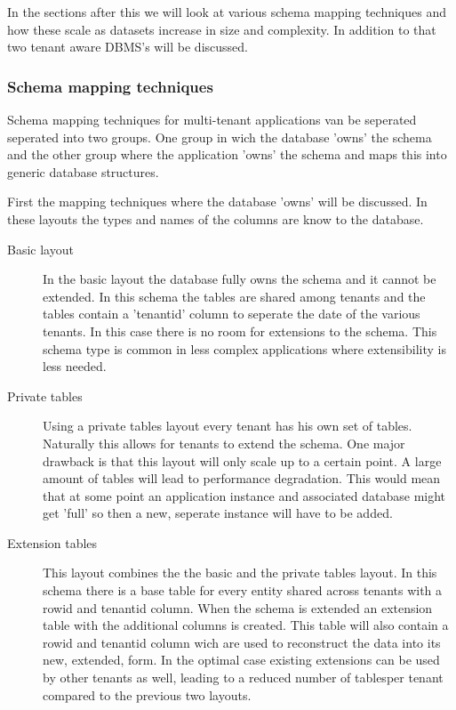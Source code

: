 In the sections after this we will look at various schema mapping techniques and how these scale as datasets increase in size and complexity.
In addition to that two tenant aware DBMS's will be discussed.

\subsubsection{Schema mapping techniques}
Schema mapping techniques for multi-tenant applications van be seperated seperated into two groups. 
One group in wich the database 'owns' the schema and the other group where the application 'owns' the schema and maps this into generic database structures.\cite{aulbach2009comparison}

First the mapping techniques where the database 'owns' will be discussed.
In these layouts the types and names of the columns are know to the database.
\begin{description}
	\item[Basic layout] In the basic layout the database fully owns the schema and it cannot be extended. 
		In this schema the tables are shared among tenants and the tables contain a 'tenantid' column to seperate the date of the various tenants.
		In this case there is no room for extensions to the schema. 
		This schema type is common in less complex applications where extensibility is less needed. \cite{aulbach2008multi}
	\item[Private tables] Using a private tables layout every tenant has his own set of tables. 
		Naturally this allows for tenants to extend the schema. 
		One major drawback is that this layout will only scale up to a certain point. 
		A large amount of tables will lead to performance degradation.
		This would mean that at some point an application instance and associated database might get 'full' so then a new, seperate instance will have to be added. \cite{aulbach2008multi}%
	\item[Extension tables]
		This layout combines the the basic and the private tables layout.
		In this schema there is a base table for every entity shared across tenants with a rowid and tenantid column.
		When the schema is extended an extension table with the additional columns is created.
		This table will also contain a rowid and tenantid column wich are used to reconstruct the data into its new, extended, form.
		In the optimal case existing extensions can be used by other tenants as well, leading to a reduced number of tablesper tenant compared to the previous two layouts.\cite{aulbach2008multi}
\end{description}

